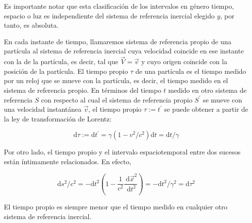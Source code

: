 Es importante notar que esta clasificación de los intervalos en género tiempo, espacio o luz es independiente del sistema de referencia inercial elegido $y$, por tanto, es absoluta.

En cada instante de tiempo, llamaremos sistema de referencia propio de una partícula al sistema de referencia inercial cuya velocidad coincide en ese instante con la de la partícula, es decir, tal que $\vec{V}=\vec{v}$ y cuyo origen coincide con la posición de la partícula. El tiempo propio $\tau$ de una partícula es el tiempo medido por un reloj que se mueve con la partícula, es decir, el tiempo medido en el sistema de referencia propio. En términos del tiempo $t$ medido en otro sistema de referencia $S$ con respecto al cual el sistema de referencia propio $S^{\prime}$ se mueve con una velocidad instantánea $\vec{v}$, el tiempo propio $\tau:=t^{\prime}$ se puede obtener a partir de la ley de transformación de Lorentz:


\[\mathrm{d} \tau:=\mathrm{d} t^{\prime}=\gamma\left(1-v^{2} / c^{2}\right) \mathrm{d} t=\mathrm{d} t / \gamma
\]

Por otro lado, el tiempo propio y el intervalo espaciotemporal entre dos sucesos están íntimamente relacionados. En efecto,

\[\mathrm{d} s^{2} / c^{2}=-\mathrm{d} t^{2}\left(1-\frac{1}{c^{2}} \frac{\mathrm{~d} \vec{x}^{2}}{\mathrm{~d} t^{2}}\right)=-\mathrm{d} t^{2} / \gamma^{2}=\mathrm{d} \tau^{2}\]

\begin{corollary}
El tiempo propio es siempre menor que el tiempo medido en cualquier otro sistema de referencia inercial.
  
\end{corollary}







